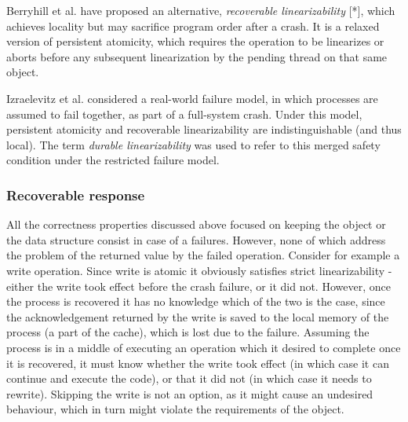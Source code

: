 \documentclass{article}
\begin{document}
Berryhill et al. have proposed an alternative, \emph{recoverable linearizability} [*], which achieves locality but may sacrifice program order after a crash. It is a relaxed version of persistent atomicity, which requires the operation to be linearizes or aborts before any subsequent linearization by the pending thread on that same object.

Izraelevitz et al. considered a real-world failure model, in which processes are assumed to fail together, as part of a full-system crash. Under this model, persistent atomicity and recoverable linearizability are indistinguishable (and thus local). The term \emph{durable linearizability} was used to refer to this merged safety condition under the restricted failure model.

\subsubsection{Recoverable response}
All the correctness properties discussed above focused on keeping the object or the data structure consist in case of a failures. However, none of which address the problem of the returned value by the failed operation. Consider for example a write operation. Since write is atomic it obviously satisfies strict linearizability - either the write took effect before the crash failure, or it did not. However, once the process is recovered it has no knowledge which of the two is the case, since the acknowledgement returned by the write is saved to the local memory of the process (a part of the cache), which is lost due to the failure. Assuming the process is in a middle of executing an operation which it desired to complete once it is recovered, it must know whether the write took effect (in which case it can continue and execute the code), or that it did not (in which case it needs to rewrite). Skipping the write is not an option, as it might cause an undesired behaviour, which in turn might violate the requirements of the object.
\end{document}
